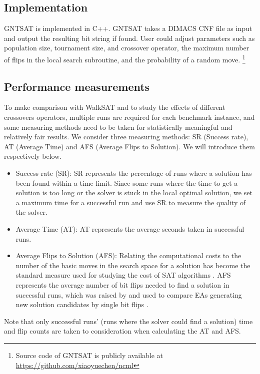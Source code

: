 \subsection{Implementation}
GNTSAT is implemented in C++. GNTSAT takes a DIMACS CNF file as input and
output the resulting bit string if found. User could adjust parameters such as
population size, tournament size, and crossover operator, the maximum number
of flips in the local search subroutine, and the probability of a random move.
\footnote{Source code of GNTSAT is publicly available at \url{https://github.com/xiaoyuechen/ncml}}

\subsection{Performance measurements}
To make comparison with WalkSAT \parencite{selman1994noise} and to study the
effects of different crossovers operators, multiple runs are required for each
benchmark instance, and some measuring methods need to be taken for
statistically meaningful and relatively fair results. We consider three
measuring methods: SR (Success rate), AT (Average Time) and AFS (Average Flips
to Solution). We will introduce them respectively below.
\begin{itemize}
	\item
	      Success rate (SR): SR represents the percentage of runs where a solution has
	      been found within a time limit. Since some runs where the time to get a
	      solution is too long or the solver is stuck in the local optimal solution, we
	      set a maximum time for a successful run and use SR to measure the quality of
	      the solver.
	\item
	      Average Time (AT): AT represents the average seconds taken in successful runs.
	\item
	      Average Flips to Solution (AFS): Relating the computational costs to the
	      number of the basic moves in the search space for a solution has become the
	      standard measure used for studying the cost of SAT algorithms
	      \parencite{Singer2000}. AFS represents the average number of bit flips needed
	      to find a solution in successful runs, which was raised by
	      \citeauthor{Voss} and used to compare EAs generating new solution
	      candidates by single bit flips \parencite{Voss}.
\end{itemize}

Note that only successful runs' (runs where the solver could find a solution)
time and flip counts are taken to consideration when calculating the AT and
AFS.
